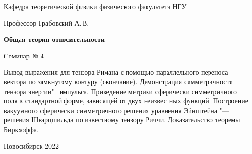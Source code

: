 \documentclass[12pt,pagesize,paper=192mm:108mm,landscape]{scrbook}
\begin{document}
\begin{titlepage}
\begin{center}
    Кафедра теоретической физики физического факультета НГУ
    \medskip

    \Large
    Профессор Грабовский А.\,В.
    \smallskip

    \huge
    \textbf{Общая теория относительности}
    \smallskip

    \Large
    Семинар № 4
    \vfill

    \normalsize
    \begin{minipage}{0.8\linewidth}Вывод выражения для тензора Римана
      с помощью параллельного переноса вектора по замкнутому контуру
      (окончание). Демонстрация симметричности тензора
      энергии"=импульса. Приведение метрики сферически симметричного
      поля к стандартной форме, зависящей от двух неизвестных
      функций. Построение вакуумного сферически симметричного решения
      уравнения Эйнштейна "--- решения Шварцшильда по известному тензору
      Риччи. Доказательство теоремы Биркхоффа.
    \end{minipage}
    \vfill

    \normalsize \ccbysa\hspace{0.5em}  Новосибирск 2022
  \end{center}
\end{titlepage}
\end{document}
